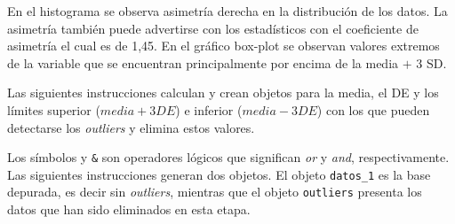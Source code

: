 \documentclass[11pt,b5paper,]{krantz}
\newenvironment{Shaded}{}{}
\newcommand{\CommentTok}[1]{\textcolor[rgb]{0.38,0.63,0.69}{\textit{#1}}}
\newcommand{\DecValTok}[1]{\textcolor[rgb]{0.25,0.63,0.44}{#1}}
\newcommand{\KeywordTok}[1]{\textcolor[rgb]{0.00,0.44,0.13}{\textbf{#1}}}
\newcommand{\NormalTok}[1]{#1}
\newcommand{\OperatorTok}[1]{\textcolor[rgb]{0.40,0.40,0.40}{#1}}
\newcommand{\StringTok}[1]{\textcolor[rgb]{0.25,0.44,0.63}{#1}}
\begin{document}
\begin{Shaded}
\end{Shaded}

En el histograma se observa asimetría derecha en la distribución de los datos. La asimetría también puede advertirse con los estadísticos con el coeficiente de asimetría el cual es de 1,45. En el gráfico box-plot se observan valores extremos de la variable que se encuentran principalmente por encima de la media \(+\) 3 SD.

Las siguientes instrucciones calculan y crean objetos para la media, el DE y los límites superior (\(media + 3DE\)) e inferior (\(media - 3DE\)) con los que pueden detectarse los \emph{outliers} y elimina estos valores.

\begin{Shaded}
\end{Shaded}

Los símbolos \texttt{\textbar{}} y \texttt{\&} son operadores lógicos que significan \emph{or} y \emph{and}, respectivamente. Las siguientes instrucciones generan dos objetos. El objeto \texttt{datos\_1} es la base depurada, es decir sin \emph{outliers}, mientras que el objeto \texttt{outliers} presenta los datos que han sido eliminados en esta etapa.

\begin{Shaded}
\end{Shaded}
\end{document}
